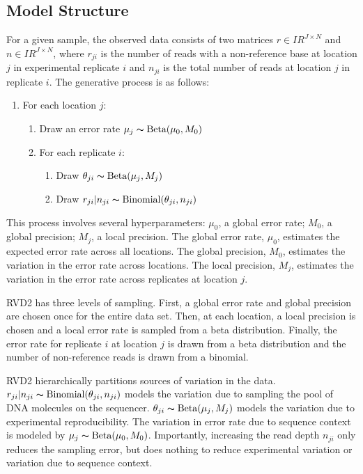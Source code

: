\documentclass[11pt,reqno]{amsart}
\newcommand{\RR}{I\!\!R} %
\begin{document}
\subsection{Model Structure}\label{sec:model_structure}

For a given sample, the observed data consists of two matrices $r \in \RR^{J \times N}$ and $n \in \RR^{J \times N}$, where $r_{ji}$ is the number of reads with a non-reference base at location $j$ in experimental replicate $i$ and $n_{ji}$ is the total number of reads at location $j$ in replicate $i$. The generative process is as follows:

\begin{enumerate}[noitemsep]
	\item For each location $j$: 
	\begin{enumerate}
		\item Draw an error rate $\mu_j \thicksim \text{Beta}(\mu_0, M_0)$
		\item For each replicate $i$:
		\begin{enumerate}
			\item Draw $\theta_{ji} \thicksim \text{Beta}(\mu_j, M_j)$
			\item Draw $r_{ji} | n_{ji} \thicksim \text{Binomial}(\theta_{ji}, n_{ji})$
		\end{enumerate}
	\end{enumerate}
\end{enumerate}

This process involves several hyperparameters: $\mu_0$, a global error rate; $M_0$, a global precision; $M_j$, a local precision. The global error rate, $\mu_0$, estimates the expected error rate across all locations. The global precision, $M_0$, estimates the variation in the error rate  across locations. The local precision, $M_j$, estimates the variation in the error rate across replicates at location $j$.

RVD2 has three levels of sampling. First, a global error rate and global precision are chosen once for the entire data set. Then, at each location, a local precision is chosen and a local error rate is sampled from a beta distribution. Finally, the error rate for replicate $i$ at location $j$ is drawn from a beta distribution and the number of non-reference reads is drawn from a binomial.

RVD2 hierarchically partitions sources of variation in the data. $r_{ji} | n_{ji} \thicksim \text{Binomial}(\theta_{ji}, n_{ji})$ models the variation due to sampling the pool of DNA molecules on the sequencer. $\theta_{ji} \thicksim \text{Beta}(\mu_j, M_j)$ models the variation due to experimental reproducibility. The variation in error rate due to sequence context is modeled by $\mu_j \thicksim \text{Beta}(\mu_0, M_0)$. Importantly, increasing the read depth $n_{ji}$ only reduces the sampling error, but does nothing to reduce experimental variation or variation due to sequence context.
\end{document}
